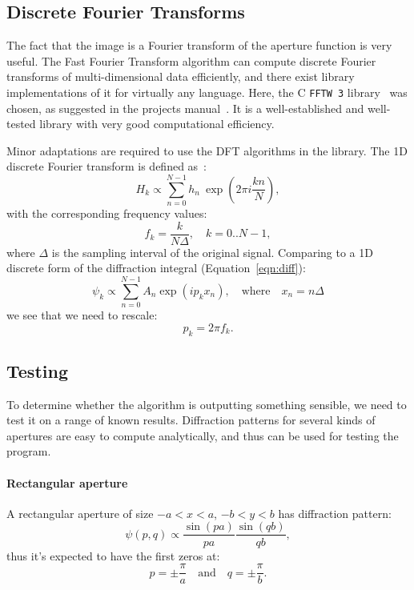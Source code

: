 \documentclass[11pt]{article}
\newcommand{\R}[1]{\mathrm{#1}}
\newcommand{\CC}{{C\nolinebreak[4]\hspace{-.05em}\raisebox{.3ex}{\scriptsize\bf ++}}}
\begin{document}
\subsection{Discrete Fourier Transforms}\label{sec:analysis:dft}
The fact that the image is a Fourier transform of the aperture function is very useful. The Fast Fourier Transform algorithm can compute discrete Fourier transforms of multi-dimensional data efficiently, and there exist library implementations of it for virtually any language. Here, the \CC{} \texttt{FFTW 3} library~\cite{fftw} was chosen, as suggested in the projects manual~\cite{manual}. It is a well-established and well-tested library with very good computational efficiency.

Minor adaptations are required to use the DFT algorithms in the library. The 1D discrete Fourier transform is defined as~\cite[Chapter 12.1]{NumRecipes}:
\begin{equation}
    H_k \propto \sum_{n=0}^{N-1} h_n\ \exp{\left( 2\pi{}i \frac{kn}{N} \right)},
\end{equation}
with the corresponding frequency values:
\begin{equation}\label{eqn:fk}
    f_k = \frac{k}{N \Delta},\quad k = 0..N-1,
\end{equation}
where $\Delta$ is the sampling interval of the original signal. Comparing to a 1D discrete form of the diffraction integral (Equation~\ref{eqn:diff}): 
\begin{equation}
    \psi_k \propto \sum_{n=0}^{N-1} A_n \exp{\left( i p_k x_n \right)},\quad \R{where} \quad x_n = n \Delta
\end{equation}
we see that we need to rescale:
\begin{equation}
    p_k = 2\pi f_k.
\end{equation}

\subsection{Testing}\label{sec:analysis:test}
To determine whether the algorithm is outputting something sensible, we need to test it on a range of known results. Diffraction patterns for several kinds of apertures are easy to compute analytically, and thus can be used for testing the program.

\paragraph{Rectangular aperture} A rectangular aperture of size $-a < x < a$, $-b < y < b$ has diffraction pattern:
\begin{equation}
    \psi(p, q) \propto \frac{\sin{\left( pa \right)}}{pa} \frac{\sin{\left( qb \right)}}{qb},
\end{equation}
thus it's expected to have the first zeros at:
\begin{equation}\label{eqn:test_rect}
    p = \pm \frac{\pi}{a}\quad \R{and} \quad q = \pm \frac{\pi}{b}.
\end{equation}
\end{document}
